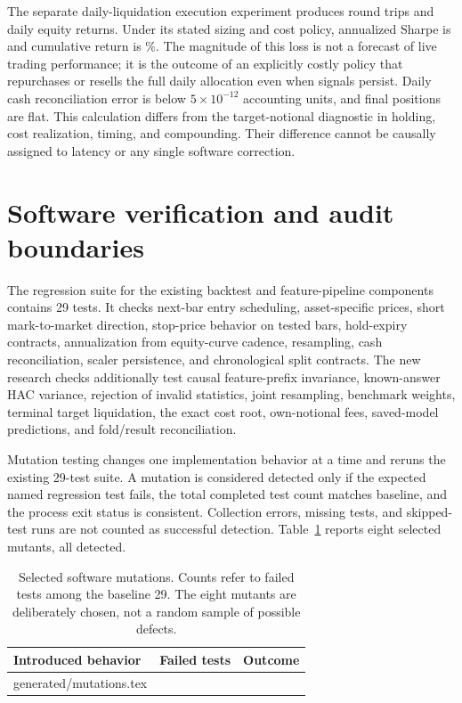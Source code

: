 \documentclass[preprint,12pt,authoryear]{elsarticle}
\makeatletter
\def\inputrows#1{\@@input #1 }
\makeatother
\begin{document}
The separate daily-liquidation execution experiment produces \PredictionCount{} round trips and \PanelDays{} daily equity returns. Under its stated sizing and cost policy, annualized Sharpe is \ExecutionSharpe{} and cumulative return is \ExecutionReturn\%. The magnitude of this loss is not a forecast of live trading performance; it is the outcome of an explicitly costly policy that repurchases or resells the full daily allocation even when signals persist. Daily cash reconciliation error is below $5\times10^{-12}$ accounting units, and final positions are flat. This calculation differs from the target-notional diagnostic in holding, cost realization, timing, and compounding. Their difference cannot be causally assigned to latency or any single software correction.

\section{Software verification and audit boundaries}
The regression suite for the existing backtest and feature-pipeline components contains 29 tests. It checks next-bar entry scheduling, asset-specific prices, short mark-to-market direction, stop-price behavior on tested bars, hold-expiry contracts, annualization from equity-curve cadence, resampling, cash reconciliation, scaler persistence, and chronological split contracts. The new research checks additionally test causal feature-prefix invariance, known-answer HAC variance, rejection of invalid statistics, joint resampling, benchmark weights, terminal target liquidation, the exact cost root, own-notional fees, saved-model predictions, and fold/result reconciliation.

Mutation testing changes one implementation behavior at a time and reruns the existing 29-test suite. A mutation is considered detected only if the expected named regression test fails, the total completed test count matches baseline, and the process exit status is consistent. Collection errors, missing tests, and skipped-test runs are not counted as successful detection. Table~\ref{tab:mutations} reports eight selected mutants, all detected.

\begin{table}[htbp]\centering\small
\caption{Selected software mutations. Counts refer to failed tests among the baseline 29. The eight mutants are deliberately chosen, not a random sample of possible defects.}\label{tab:mutations}
\begin{tabular}{lrl}\toprule
Introduced behavior & Failed tests & Outcome\\\midrule
\inputrows{generated/mutations.tex}
\bottomrule\end{tabular}\end{table}
\end{document}
